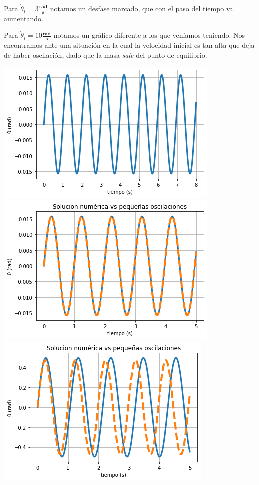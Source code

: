 \documentclass{article}
\begin{document}
\begin{enumerate}
		
		
		Para $\dot{\theta}_i = 3 \frac{\textbf{rad}}{\textbf{s}}$ notamos un desfase marcado, que con el paso del tiempo va aumentando.
		
		
		
		Para $\dot{\theta}_i = 10 \frac{\textbf{rad}}{\textbf{s}}$ notamos un gr\'afico diferente a los que ven\'iamos teniendo. Nos encontramos ante una situaci\'on en la cual la velocidad inicial es tan alta que deja de haber oscilaci\'on, dado que la masa \emph{sale} del punto de equilibrio.
		
		\begin{center}
			\includegraphics[scale=0.5]{03.png}
			\includegraphics[scale=0.5]{04.png}
			\includegraphics[scale=0.5]{05.png}

\end{center}
\end{enumerate}
\end{document}
